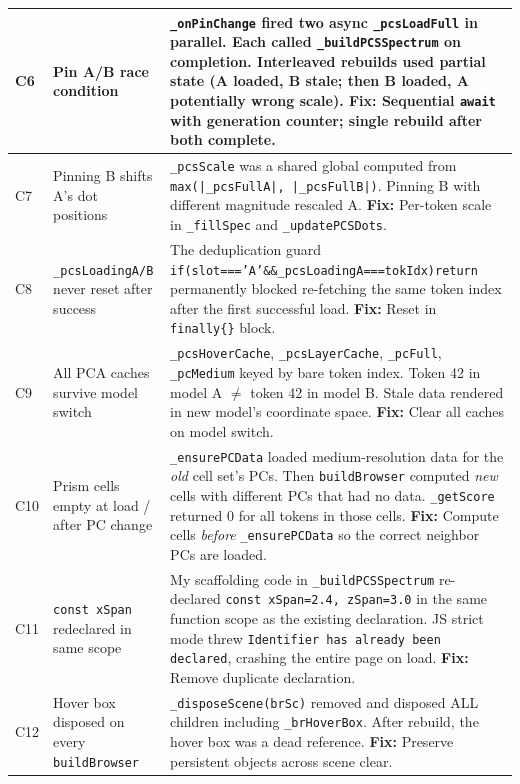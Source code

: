 \documentclass[11pt,a4paper]{article}
\begin{document}
\begin{longtable}{p{}p{}p{}}
\midrule
C6 & Pin A/B race condition & \texttt{\_onPinChange} fired two async \texttt{\_pcsLoadFull} in parallel. Each called \texttt{\_buildPCSSpectrum} on completion. Interleaved rebuilds used partial state (A loaded, B stale; then B loaded, A potentially wrong scale). \textbf{Fix:} Sequential \texttt{await} with generation counter; single rebuild after both complete. \\
\midrule
C7 & Pinning B shifts A's dot positions & \texttt{\_pcsScale} was a shared global computed from \texttt{max(|\_pcsFullA|, |\_pcsFullB|)}. Pinning B with different magnitude rescaled A. \textbf{Fix:} Per-token scale in \texttt{\_fillSpec} and \texttt{\_updatePCSDots}. \\
\midrule
C8 & \texttt{\_pcsLoadingA/B} never reset after success & The deduplication guard \texttt{if(slot==='A'\&\&\_pcsLoadingA===tokIdx)return} permanently blocked re-fetching the same token index after the first successful load. \textbf{Fix:} Reset in \texttt{finally\{\}} block. \\
\midrule
C9 & All PCA caches survive model switch & \texttt{\_pcsHoverCache}, \texttt{\_pcsLayerCache}, \texttt{\_pcFull}, \texttt{\_pcMedium} keyed by bare token index. Token 42 in model A $\neq$ token 42 in model B. Stale data rendered in new model's coordinate space. \textbf{Fix:} Clear all caches on model switch. \\
\midrule
C10 & Prism cells empty at load / after PC change & \texttt{\_ensurePCData} loaded medium-resolution data for the \emph{old} cell set's PCs. Then \texttt{buildBrowser} computed \emph{new} cells with different PCs that had no data. \texttt{\_getScore} returned 0 for all tokens in those cells. \textbf{Fix:} Compute cells \emph{before} \texttt{\_ensurePCData} so the correct neighbor PCs are loaded. \\
\midrule
C11 & \texttt{const xSpan} redeclared in same scope & My scaffolding code in \texttt{\_buildPCSSpectrum} re-declared \texttt{const xSpan=2.4, zSpan=3.0} in the same function scope as the existing declaration. JS strict mode threw \texttt{Identifier has already been declared}, crashing the entire page on load. \textbf{Fix:} Remove duplicate declaration. \\
\midrule
C12 & Hover box disposed on every \texttt{buildBrowser} & \texttt{\_disposeScene(brSc)} removed and disposed ALL children including \texttt{\_brHoverBox}. After rebuild, the hover box was a dead reference. \textbf{Fix:} Preserve persistent objects across scene clear. \\

\end{longtable}
\end{document}
